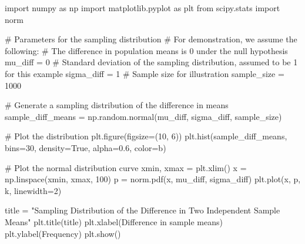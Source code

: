\documentclass[
  letterpaper,
  DIV=11,
  numbers=noendperiod]{scrartcl}
\newenvironment{Shaded}{\begin{snugshade}}{\end{snugshade}}
\newcommand{\CommentTok}[1]{\textcolor[rgb]{0.37,0.37,0.37}{#1}}
\newcommand{\DecValTok}[1]{\textcolor[rgb]{0.68,0.00,0.00}{#1}}
\newcommand{\FloatTok}[1]{\textcolor[rgb]{0.68,0.00,0.00}{#1}}
\newcommand{\ImportTok}[1]{\textcolor[rgb]{0.00,0.46,0.62}{#1}}
\newcommand{\NormalTok}[1]{\textcolor[rgb]{0.00,0.23,0.31}{#1}}
\newcommand{\OperatorTok}[1]{\textcolor[rgb]{0.37,0.37,0.37}{#1}}
\newcommand{\StringTok}[1]{\textcolor[rgb]{0.13,0.47,0.30}{#1}}
\newcommand{\VariableTok}[1]{\textcolor[rgb]{0.07,0.07,0.07}{#1}}
\begin{document}
\begin{Shaded}
\begin{Highlighting}[]
\ImportTok{import}\NormalTok{ numpy }\ImportTok{as}\NormalTok{ np}
\ImportTok{import}\NormalTok{ matplotlib.pyplot }\ImportTok{as}\NormalTok{ plt}
\ImportTok{from}\NormalTok{ scipy.stats }\ImportTok{import}\NormalTok{ norm}

\CommentTok{\# Parameters for the sampling distribution}
\CommentTok{\# For demonstration, we assume the following:}
\CommentTok{\# The difference in population means is 0 under the null hypothesis}
\NormalTok{mu\_diff }\OperatorTok{=} \DecValTok{0}
\CommentTok{\# Standard deviation of the sampling distribution, assumed to be 1 for this example}
\NormalTok{sigma\_diff }\OperatorTok{=} \DecValTok{1}
\CommentTok{\# Sample size for illustration}
\NormalTok{sample\_size }\OperatorTok{=} \DecValTok{1000}

\CommentTok{\# Generate a sampling distribution of the difference in means}
\NormalTok{sample\_diff\_means }\OperatorTok{=}\NormalTok{ np.random.normal(mu\_diff, sigma\_diff, sample\_size)}

\CommentTok{\# Plot the distribution}
\NormalTok{plt.figure(figsize}\OperatorTok{=}\NormalTok{(}\DecValTok{10}\NormalTok{, }\DecValTok{6}\NormalTok{))}
\NormalTok{plt.hist(sample\_diff\_means, bins}\OperatorTok{=}\DecValTok{30}\NormalTok{, density}\OperatorTok{=}\VariableTok{True}\NormalTok{, alpha}\OperatorTok{=}\FloatTok{0.6}\NormalTok{, color}\OperatorTok{=}\StringTok{\textquotesingle{}b\textquotesingle{}}\NormalTok{)}

\CommentTok{\# Plot the normal distribution curve}
\NormalTok{xmin, xmax }\OperatorTok{=}\NormalTok{ plt.xlim()}
\NormalTok{x }\OperatorTok{=}\NormalTok{ np.linspace(xmin, xmax, }\DecValTok{100}\NormalTok{)}
\NormalTok{p }\OperatorTok{=}\NormalTok{ norm.pdf(x, mu\_diff, sigma\_diff)}
\NormalTok{plt.plot(x, p, }\StringTok{\textquotesingle{}k\textquotesingle{}}\NormalTok{, linewidth}\OperatorTok{=}\DecValTok{2}\NormalTok{)}

\NormalTok{title }\OperatorTok{=} \StringTok{"Sampling Distribution of the Difference in Two Independent Sample Means"}
\NormalTok{plt.title(title)}
\NormalTok{plt.xlabel(}\StringTok{\textquotesingle{}Difference in sample means\textquotesingle{}}\NormalTok{)}
\NormalTok{plt.ylabel(}\StringTok{\textquotesingle{}Frequency\textquotesingle{}}\NormalTok{)}
\NormalTok{plt.show()}
\end{Highlighting}
\end{Shaded}
\end{document}
